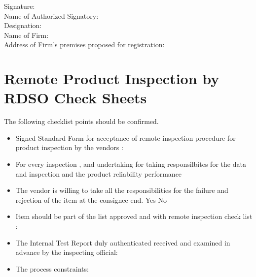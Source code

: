 \documentclass[
]{article}
\begin{document}
Signature:\\
Name of Authorized Signatory:\\
Designation:\\
Name of Firm:\\
Address of Firm's premises proposed for registration:

\newpage

\hypertarget{remote-product-inspection-by-rdso-check-sheets}{%
\section{Remote Product Inspection by RDSO Check
Sheets}\label{remote-product-inspection-by-rdso-check-sheets}}

The following checklist points should be confirmed.

\begin{itemize}
\item
  Signed Standard Form for acceptance of remote inspection procedure for
  product inspection by the vendors :
\item
  For every inspection , and undertaking for taking responsilbites for
  the data and inspection and the product reliability performance
\item
  The vendor is willing to take all the responsibilities for the failure
  and rejection of the item at the consignee end. Yes No
\item
  Item should be part of the list approved and with remote inspection
  check list :
\item
  The Internal Test Report duly authenticated received and examined in
  advance by the inspecting official:
\item
  The process constraints:


\end{itemize}
\end{document}
